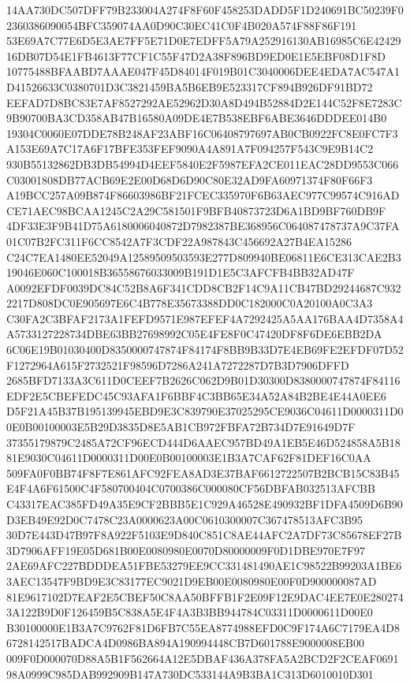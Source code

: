 \documentclass[UTF8,fontset=fandol,zihao=-4,a4paper]{ctexart}
\begin{document}
{{14AA730DC507DFF79B233004A274F8F60F458253DADD5F1D240691BC50239F02360386090054BFC359074AA0D90C30EC41C0F4B020A574F88F86F191
53E69A7C77E6D5E3AE7FF5E71D0E7EDFF5A79A252916130AB16985C6E4242916DB07D54E1FB4613F77CF1C55F47D2A38F896BD9ED0E1E5EBF08D1F8D
10775488BFAABD7AAAE047F45D84014F019B01C3040006DEE4EDA7AC547A1D41526633C0380701D3C3821459BA5B6EB9E523317CF894B926DF91BD72
EEFAD7D8BC83E7AF8527292AE52962D30A8D494B52884D2E144C52F8E7283C9B90700BA3CD358AB47B16580A09DE4E7B538EBF6ABE3646DDDEE014B0
19304C0060E07DDE78B248AF23ABF16C06408797697AB0CB0922FC8E0FC7F3A153E69A7C17A6F17BFE353FEF9090A4A891A7F094257F543C9E9B14C2
930B55132862DB3DB54994D4EEF5840E2F5987EFA2CE011EAC28DD9553C066C03001808DB77ACB69E2E00D68D6D90C80E32AD9FA60971374F80F66F3
A19BCC257A09B874F86603986BF21FCEC335970F6B63AEC977C99574C916ADCE71AEC98BCAA1245C2A29C581501F9BFB40873723D6A1BD9BF760DB9F
4DF33E3F9B41D75A6180006040872D7982387BE368956C064087478737A9C37FA01C07B2FC311F6CC8542A7F3CDF22A987843C456692A27B4EA15286
C24C7EA1480EE52049A12589509503593E277D809940BE06811E6CE313CAE2B319046E060C100018B36558676033009B191D1E5C3AFCFB4BB32AD47F
A0092EFDF0039DC84C52B8A6F341CDD8CB2F14C9A11CB47BD29244687C9322217D808DC0E905697E6C4B778E35673388DD0C182000C0A20100A0C3A3
C30FA2C3BFAF2173A1FEFD9571E987EFEF4A7292425A5AA176BAA4D7358A4A5733127228734DBE63BB27698992C05E4FE8F0C47420DF8F6DE6EBB2DA
6C06E19B01030400D8350000747874F84174F8BB9B33D7E4EB69FE2EFDF07D52F1272964A615F2732521F98596D7286A241A7272287D7B3D7906DFFD
2685BFD7133A3C611D0CEEF7B2626C062D9B01D30300D8380000747874F84116EDF2E5CBEFEDC45C93AFA1F6BBF4C3BB65E34A52A84B2BE4E44A0EE6
D5F21A45B37B195139945EBD9E3C839790E37025295CE9036C04611D0000311D00E0B00100003E5B29D3835D8E5AB1CB972FBFA72B734D7E91649D7F
37355179879C2485A72CF96ECD444D6AAEC957BD49A1EB5E46D524858A5B1881E9030C04611D0000311D00E0B00100003E1B3A7CAF62F81DEF16C0AA
509FA0F0BB74F8F7E861AFC92FEA8AD3E37BAF6612722507B2BCB15C83B45E4F4A6F61500C4F580700404C0700386C000080CF56DBFAB032513AFCBB
C43317EAC385FD49A35E9CF2BBB5E1C929A46528E490932BF1DFA4509D6B90D3EB49E92D0C7478C23A0000623A00C0610300007C367478513AFC3B95
30D7E443D47B97F8A922F5103E9D840C851C8AE44AFC2A7DF73C85678EF27B3D7906AFF19E05D681B00E0080980E0070D80000009F0D1DBE970E7F97
2AE69AFC227BDDDEA51FBE53279EE9CC331481490AE1C98522B99203A1BE63AEC13547F9BD9E3C83177EC9021D9EB00E0080980E00F0D900000087AD
81E9617102D7EAF2E5CBEF50C8AA50BFFB1F2E09F12E9DAC4EE7E0E2802743A122B9D0F126459B5C838A5E4F4A3B3BB944784C03311D0000611D00E0
B30100000E1B3A7C9762F81D6FB7C55EA8774988EFD0C9F174A6C7179EA4D86728142517BADCA4D0986BA894A190994448CB7D601788E9000008EB00
009F0D000070D88A5B1F562664A12E5DBAF436A378FA5A2BCD2F2CEAF069198A0999C985DAB992909B147A730DC533144A9B3BA1C313D6010010D301
}}
\end{document}
